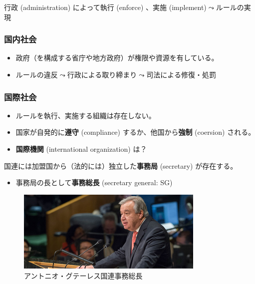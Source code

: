 \documentclass[
  xelatex,
  ja=standard]{bxjsarticle}
\providecommand{\tightlist}{%
  \setlength{\itemsep}{0pt}\setlength{\parskip}{0pt}}\usepackage{longtable,booktabs,array}
\begin{document}
行政 (administration) によって執行 (enforce) 、実施
(implement)\(\leadsto\)ルールの実現

\hypertarget{ux56fdux5185ux793eux4f1a-1}{%
\subsubsection{国内社会}\label{ux56fdux5185ux793eux4f1a-1}}

\begin{itemize}
\tightlist
\item
  政府（を構成する省庁や地方政府）が権限や資源を有している。
\item
  ルールの違反\(\leadsto\)行政による取り締まり\(\leadsto\)司法による修復・処罰
\end{itemize}

\hypertarget{ux56fdux969bux793eux4f1a-1}{%
\subsubsection{国際社会}\label{ux56fdux969bux793eux4f1a-1}}

\begin{itemize}
\tightlist
\item
  ルールを執行、実施する組織は存在しない。
\item
  国家が自発的に\textbf{遵守} (compliance) するか、他国から\textbf{強制}
  (coersion) される。
\item
  \textbf{国際機関} (international organization) は？
\end{itemize}

国連には加盟国から（法的には）独立した\textbf{事務局} (secretary)
が存在する。

\begin{itemize}
\tightlist
\item
  事務局の長として\textbf{事務総長} (secretary general: SG)
\end{itemize}

\begin{figure}[htpb]

{\centering \includegraphics[width=0.8\textwidth,height=\textheight]{international_society_files/mediabag/707593-guterres-sg.jpg}

}

\caption{アントニオ・グテーレス国連事務総長}

\end{figure}
\end{document}
